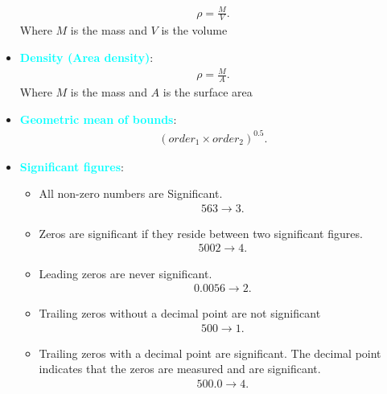 \documentclass{report}
\begin{document}
\begin{itemize}
            \begin{align*}
                \rho = \frac{M}{V}
            .\end{align*}
            Where $M$ is the mass and $V$ is the volume
        \item \textbf{\textcolor{cyan}{Density (Area density)}}:
            \begin{align*}
                \rho = \frac{M}{A}
            .\end{align*}
            Where $M$ is the mass and $A$ is the surface area
        \item \textbf{\textcolor{cyan}{Geometric mean of bounds}}:
            \begin{align*}
                (order_{1} \times order_{2})^{0.5}
            .\end{align*}
        \item \textbf{\textcolor{cyan}{Significant figures}}: 
            \begin{itemize}
                \item All non-zero numbers are Significant.
                    \begin{align*}
                        563 \rightarrow 3
                    .\end{align*}
                \item Zeros are significant if they reside between two significant figures.
                    \begin{align*}
                        5002 \rightarrow 4
                    .\end{align*}
                \item Leading zeros are never significant. 
                    \begin{align*}
                        0.0056 \rightarrow 2
                    .\end{align*}
                \item Trailing zeros without a decimal point are not significant
                    \begin{align*}
                        500 \rightarrow 1
                    .\end{align*}
                \item Trailing zeros with a decimal point are significant. The decimal point indicates that the zeros are measured and are significant. 
                    \begin{align*}
                        500.0 \rightarrow 4
                    .\end{align*}

\end{itemize}
\end{itemize}
\end{document}
